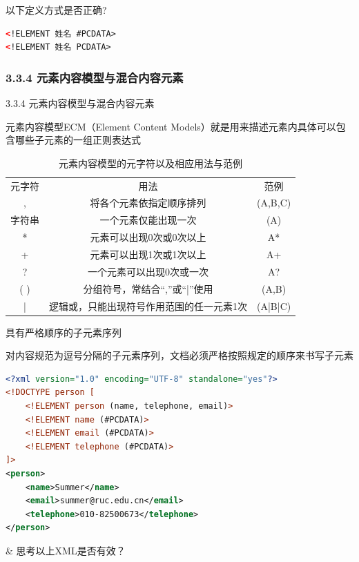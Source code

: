 \begin{frame}[fragile]{以下定义方式是否正确?}
\begin{lstlisting}[tabsize=8, basicstyle=\small\tt, language=XML]
<!ELEMENT 姓名 #PCDATA>
<!ELEMENT 姓名 PCDATA>
\end{lstlisting}

\end{frame}


\subsubsection{3.3.4 元素内容模型与混合内容元素}
\begin{frame}[fragile]{3.3.4 元素内容模型与混合内容元素}
\begin{shaded}
\par 元素内容模型ECM（Element Content Models）就是用来描述元素内具体可以包含哪些子元素的一组正则表达式
\end{shaded}
\begin{table}[!hbp] 
\begin{tabular}{|c|c|c|}
\Xhline{1.3pt}
元字符 & 用法 & 范例 \\
\Xhline{1.3pt}
, & 将各个元素依指定顺序排列 & (A,B,C) \\
\hline
字符串 &  一个元素仅能出现一次 &  (A) \\
\hline
* & 元素可以出现0次或0次以上 & A*\\
\hline
+ & 元素可以出现1次或1次以上 & A+\\
\hline
? & 一个元素可以出现0次或一次 & A? \\
\hline
( ) & 分组符号，常结合“,”或“|”使用 &  (A,B) \\
\hline
|  &  逻辑或，只能出现符号作用范围的任一元素1次 & (A|B|C)\\
\hline
\end{tabular}
\caption{元素内容模型的元字符以及相应用法与范例}
\end{table}
\end{frame}


\begin{frame}[fragile]{具有严格顺序的子元素序列}
\begin{shaded}
对内容规范为逗号分隔的子元素序列，文档必须严格按照规定的顺序来书写子元素
\end{shaded}

\begin{lstlisting}[tabsize=8, basicstyle=\small\tt, language=XML]
<?xml version="1.0" encoding="UTF-8" standalone="yes"?>
<!DOCTYPE person [
    <!ELEMENT person (name, telephone, email)>
    <!ELEMENT name (#PCDATA)>
    <!ELEMENT email (#PCDATA)>
    <!ELEMENT telephone (#PCDATA)>    
]>
<person>
    <name>Summer</name>
    <email>summer@ruc.edu.cn</email>
    <telephone>010-82500673</telephone>    
</person>
\end{lstlisting}
\begin{easylist} \easyitem    
& 思考以上XML是否有效？
\end{easylist}
\end{frame}


